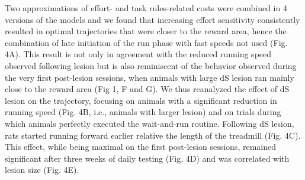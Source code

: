 Two approximations of effort- and task rules-related costs were combined in 4 versions of the models and we found that increasing effort sensitivity consistently resulted in optimal trajectories that were closer to the reward area, hence the combination of late initiation of the run phase with fast speeds not used (Fig. 4A).
This result is not only in agreement with the reduced running speed observed following lesion but is also reminiscent of the behavior observed during the very first post-lesion sessions, when animals with large dS lesion ran mainly close to the reward area (Fig 1, F and G). 
We thus reanalyzed the effect of dS lesion on the trajectory, focusing on animals with a significant reduction in running speed (Fig. 4B, i.e., animals with larger lesion) and on trials during which animals perfectly executed the wait-and-run routine.
Following dS lesion, rats started running forward earlier relative the length of the treadmill (Fig. 4C).
This effect, while being maximal on the first post-lesion sessions, remained significant after three weeks of daily testing (Fig. 4D) and was correlated with lesion size (Fig. 4E).









